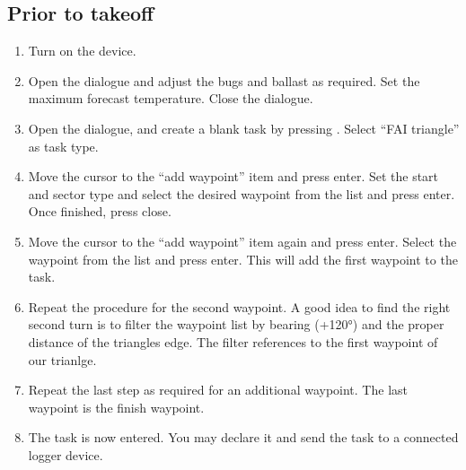 \subsection*{Prior to takeoff}
\begin{enumerate}
\item  Turn on the device.
\item  Open the  dialogue and adjust the bugs and ballast as
  required. Set the maximum forecast temperature.  Close the dialogue.
\item  Open the  dialogue, and create a blank task by pressing
. Select ``FAI triangle'' as task type.
\item  Move the cursor to the ``add waypoint'' item and press enter.  Set the
  start and sector type and select the desired waypoint from the list and press
  enter.  Once finished, press close.
\item  Move the cursor to the ``add waypoint'' item again and press enter.
  Select the waypoint from the list and press enter.  This will add the first
  waypoint to the task.
\item  Repeat the procedure for the second waypoint. A good idea to find the
  right second turn is to filter the waypoint list by bearing (+120°) and the
  proper distance of the triangles edge. The filter references to
  the first waypoint of our trianlge.
\item  Repeat the last step as required for an additional waypoint.  The last
  waypoint is the finish waypoint.
\item  The task is now entered.  You may declare it and send the task to a
  connected logger device.
\end{enumerate}

